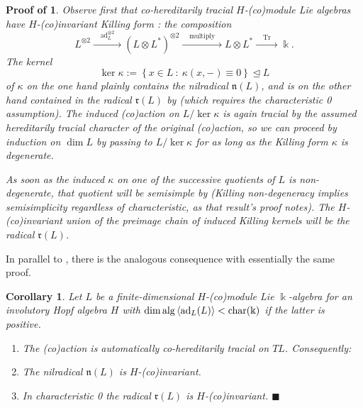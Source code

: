 \documentclass[11pt,leqno]{article}
\theoremstyle{plain}
\newtheorem{corollary}[lemma]{Corollary}
\theoremstyle{plain}
\theoremstyle{plain}
\numberwithin{equation}{section}
\theoremstyle{nonumberplain}
\newcommand\pf[1]{\newtheorem{#1}{Proof of \Cref{#1}}}
\newcommand\fn{{\mathfrak n}}
\newcommand\fr{{\mathfrak r}}
\newcommand\1{{\bf 1}}
\newcommand{\qedhere}{\mbox{}\hfill\ensuremath{\blacksquare}}
\begin{document}
\pf{th:char0.solv.rad.trcl}
\begin{th:char0.solv.rad.trcl}
  Observe first that co-hereditarily tracial $H$-(co)module Lie algebras have $H$-(co)invariant \emph{Killing form} \cite[\S 5.1]{hmph_1972}: the composition
  \begin{equation*}
    L^{\otimes 2}
    \xrightarrow{\quad\mathrm{ad}_L^{\otimes 2}\quad}
    \left(L\otimes L^*\right)^{\otimes 2}
    \xrightarrow{\quad\text{multiply}\quad}
    L\otimes L^*
    \xrightarrow{\quad\mathrm{Tr}\quad}
    \Bbbk.
  \end{equation*}
  The kernel
  \begin{equation*}
    \ker \kappa:=\left\{x\in L\ :\ \kappa(x,-)\equiv 0\right\}
    \trianglelefteq
    L
  \end{equation*}
  of $\kappa$ on the one hand plainly contains the nilradical $\fn(L)$, and is on the other hand contained in the radical $\fr(L)$ by \cite[\S 5.1, proof of Theorem]{hmph_1972} (which requires the characteristic 0 assumption). The induced (co)action on $L/\ker \kappa$ is again tracial by the assumed hereditarily tracial character of the original (co)action, so we can proceed by induction on $\dim L$ by passing to $L/\ker\kappa$ for as long as the Killing form $\kappa$ is degenerate.
  
  As soon as the induced $\kappa$ on one of the successive quotients of $L$ is non-degenerate, that quotient will be semisimple by \cite[\S 5.1, Theorem]{hmph_1972} (Killing non-degeneracy implies semisimplicity regardless of characteristic, as that result's proof notes). The $H$-(co)invariant union of the preimage chain of induced Killing kernels will be the radical $\fr(L)$.
\end{th:char0.solv.rad.trcl}



In parallel to , there is the analogous consequence with essentially the same proof.

\begin{corollary}\label{cor:h.inv.lie}
  Let $L$ be a finite-dimensional $H$-(co)module Lie $\Bbbk$-algebra for an involutory Hopf algebra $H$ with $\dim \mathrm{alg}\Braket{\mathrm{ad}_L(L)}<\mathrm{char}(\Bbbk)$ if the latter is positive.

  \begin{enumerate}[(1),wide]
  \item The (co)action is automatically co-hereditarily tracial on $TL$. Consequently:

  \item The nilradical $\fn(L)$ is $H$-(co)invariant.

  \item In characteristic 0 the radical $\fr(L)$ is $H$-(co)invariant.  \qedhere
  \end{enumerate}  
\end{corollary}
\end{document}
